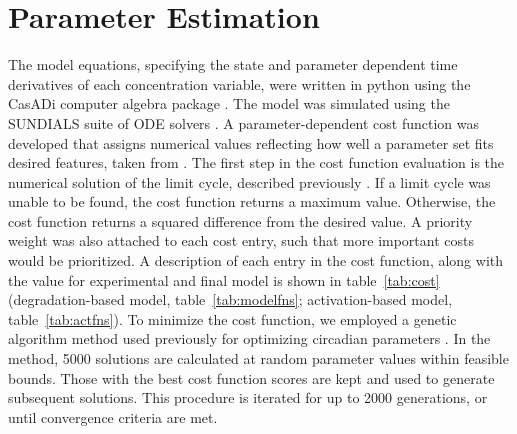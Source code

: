 \section{Parameter Estimation}\label{sec:parameter}
The model equations, specifying the state and parameter dependent time derivatives of each concentration variable, were written in python using the CasADi computer algebra package \cite{Andersson2010}. The model was simulated using the SUNDIALS suite of ODE solvers \cite{Hindmarsh2005}. A parameter-dependent cost function was developed that assigns numerical values reflecting how well a parameter set fits desired features, taken from \cite{Lee2001}. The first step in the cost function evaluation is the numerical solution of the limit cycle, described previously \cite{Wilkins2009}. If a limit cycle was unable to be found, the cost function returns a maximum value. Otherwise, the cost function returns a squared difference from the desired value. A priority weight was also attached to each cost entry, such that more important costs would be prioritized. A description of each entry in the cost function, along with the value for experimental and final model is shown in table~\ref{tab:cost} (degradation-based model, table~\ref{tab:modelfns}; activation-based model, table~\ref{tab:actfns}). To minimize the cost function, we employed a genetic algorithm method used previously for optimizing circadian parameters \cite{Mirsky2009}. In the method, 5000 solutions are calculated at random parameter values within feasible bounds. Those with the best cost function scores are kept and used to generate subsequent solutions. This procedure is iterated for up to 2000 generations, or until convergence criteria are met.

